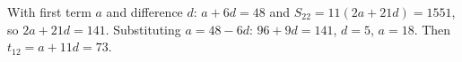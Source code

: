 With first term $a$ and difference $d$: $a+6d=48$ and $S_{22}=11(2a+21d)=1551$, so $2a+21d=141$. Substituting $a=48-6d$: $96+9d=141$, $d=5$, $a=18$. Then $t_{12}=a+11d=\boxed{73}$.
